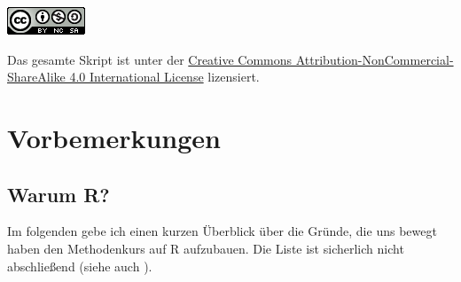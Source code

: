 \documentclass[]{tufte-book}
\begin{document}
\begin{center}\includegraphics[width=0.2\linewidth]{figures/license} \end{center}

Das gesamte Skript ist unter der
\href{http://creativecommons.org/licenses/by-nc-sa/4.0/}{Creative
Commons Attribution-NonCommercial-ShareAlike 4.0 International License}
lizensiert.

\chapter{Vorbemerkungen}\label{precons}

\section{Warum R?}\label{warum-r}

Im folgenden gebe ich einen kurzen Überblick über die Gründe, die uns
bewegt haben den Methodenkurs auf R aufzubauen. Die Liste ist sicherlich
nicht abschließend (siehe auch \citet{adv-r}).
\end{document}
